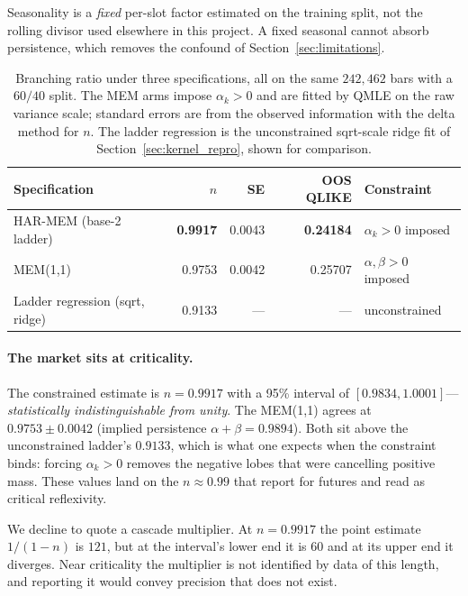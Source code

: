 Seasonality is a \emph{fixed} per-slot factor estimated on the training split,
not the rolling divisor used elsewhere in this project. A fixed seasonal cannot
absorb persistence, which removes the confound of
Section~\ref{sec:limitations}.

\begin{table}[H]
\centering
\caption{Branching ratio under three specifications, all on the same
$242{,}462$ bars with a $60/40$ split. The MEM arms impose $\alpha_k > 0$ and
are fitted by QMLE on the raw variance scale; standard errors are from the
observed information with the delta method for $n$. The ladder regression is
the unconstrained sqrt-scale ridge fit of
Section~\ref{sec:kernel_repro}, shown for comparison.}
\label{tab:mem}
\begin{tabular}{lrrrl}
\toprule
Specification & $n$ & SE & OOS QLIKE & Constraint \\
\midrule
HAR-MEM (base-2 ladder)  & \textbf{0.9917} & 0.0043 & \textbf{0.24184} & $\alpha_k > 0$ imposed \\
MEM(1,1)                 & 0.9753 & 0.0042 & 0.25707 & $\alpha, \beta > 0$ imposed \\
Ladder regression (sqrt, ridge) & 0.9133 & --- & --- & unconstrained \\
\bottomrule
\end{tabular}
\end{table}

\paragraph{The market sits at criticality.} The constrained estimate is
$n = 0.9917$ with a 95\% interval of $[0.9834, 1.0001]$---\emph{statistically
indistinguishable from unity}. The MEM(1,1) agrees at $0.9753 \pm 0.0042$
(implied persistence $\alpha + \beta = 0.9894$). Both sit above the
unconstrained ladder's $0.9133$, which is what one expects when the constraint
binds: forcing $\alpha_k > 0$ removes the negative lobes that were cancelling
positive mass. These values land on the $n \approx 0.99$ that
\citet{HardimanBercotBouchaud2013} report for futures and read as critical
reflexivity.

We decline to quote a cascade multiplier. At $n = 0.9917$ the point estimate
$1/(1-n)$ is $121$, but at the interval's lower end it is $60$ and at its upper
end it diverges. Near criticality the multiplier is not identified by data of
this length, and reporting it would convey precision that does not exist.

